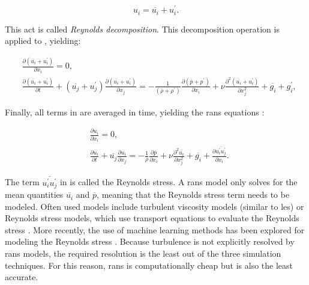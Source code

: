 \begin{equation}
    u_i = \overline{u_i} + u_i^\prime.
    \label{eq:reynolds_decomposition}
\end{equation}

This act is called \emph{Reynolds decomposition}. This decomposition operation is applied to , yielding:

\begin{align}
    &\frac{\partial \left( \overline{u_i} + u_i^\prime \right)}{\partial x_i} = 0, \label{eq:reynolds_mass}\\
    &\frac{\partial \left( \overline{u_i} + u_i^\prime \right)}{\partial t} + \left( \overline{u_j} + u_j^\prime \right) \frac{\partial \left( \overline{u_i} + u_i^\prime \right)}{\partial x_j} = - \frac{1}{\left( \overline{\rho} + \rho^\prime \right)} \frac{\partial \left( \overline{p} + p^\prime \right)}{\partial x_i} + \nu \frac{\partial^2 \left( \overline{u_i} + u_i^\prime \right)}{\partial x_j^2} + \overline{g_i} + g_i^\prime,
    \label{eq:reynolds_momentum}
\end{align}

Finally, all terms in  are averaged in time, yielding the \acrshort{rans} equations \citep[Chapter~4]{popeTurbulentFlows2000}:

\begin{align}
    &\frac{\partial \overline{u_i}}{\partial x_i} = 0, \label{eq:rans_mass}\\
    &\frac{\partial \overline{u_i}}{\partial t} + \overline{u_j} \frac{\partial \overline{u_i}}{\partial x_j} = - \frac{1}{\overline{\rho}} \frac{\partial \overline{p}}{\partial x_i} + \nu \frac{\partial^2 \overline{u_i}}{\partial x_j^2} + \overline{g_i} + \frac{\partial \overline{u_i^\prime u_j^\prime}}{\partial x_i}. \label{eq:rans_momentum}
\end{align}

The term $\overline{u_i^\prime u_j^\prime}$ in  is called the Reynolds stress. A \acrshort{rans} model only solves  for the mean quantities $\overline{u_i}$ and $\overline{p}$, meaning that the Reynolds stress term needs to be modeled. Often used models include turbulent viscosity models (similar to \acrshort{les}) or Reynolds stress models, which use transport equations to evaluate the Reynolds stress \citep{popeTurbulentFlows2000}. More recently, the use of machine learning methods has been explored for modeling the Reynolds stress \citep{bruntonMachineLearningFluid2020}. Because turbulence is not explicitly resolved by \acrshort{rans} models, the required resolution is the least out of the three simulation techniques. For this reason, \acrshort{rans} is computationally cheap but is also the least accurate.

